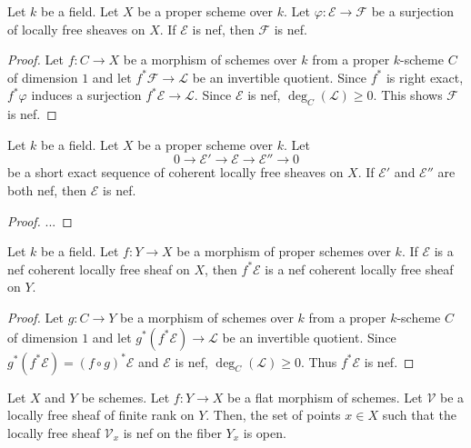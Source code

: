\begin{lemma}
\label{lemma-nef-bundle-quotient-nef}
Let $k$ be a field.
Let $X$ be a proper scheme over $k$.
Let $\varphi : \mathcal{E} \to \mathcal{F}$ be a surjection of locally free
sheaves on $X$.
If $\mathcal{E}$ is nef, then $\mathcal{F}$ is nef.
\end{lemma}

\begin{proof}
Let $f : C \to X$ be a morphism of schemes over $k$ from a proper $k$-scheme
$C$ of dimension $1$ and let $f^*\mathcal{F} \to \mathcal{L}$ be an invertible
quotient.
Since $f^*$ is right exact, $f^*\varphi$ induces a surjection
$f^*\mathcal{E} \to \mathcal{L}$.
Since $\mathcal{E}$ is nef, $\deg_C(\mathcal{L}) \geq 0$.
This shows $\mathcal{F}$ is nef.
\end{proof}

\begin{lemma}
\label{lemma-nef-bundle-extension-nef}
Let $k$ be a field.
Let $X$ be a proper scheme over $k$.
Let
$$
0 \to \mathcal{E}' \to \mathcal{E} \to \mathcal{E}'' \to 0
$$
be a short exact sequence of coherent locally free sheaves on $X$.
If $\mathcal{E}'$ and $\mathcal{E}''$ are both nef, then $\mathcal{E}$ is nef.
\end{lemma}

\begin{proof}
...
\end{proof}

\begin{lemma}
\label{lemma-nef-pullback-nef-vb}
Let $k$ be a field.
Let $f : Y \to X$ be a morphism of proper schemes over $k$.
If $\mathcal{E}$ is a nef coherent locally free sheaf on $X$, then
$f^*\mathcal{E}$ is a nef coherent locally free sheaf on $Y$.
\end{lemma}

\begin{proof}
Let $g : C \to Y$ be a morphism of schemes over $k$ from a proper $k$-scheme
$C$ of dimension $1$ and let $g^*(f^*\mathcal{E}) \to \mathcal{L}$ be an
invertible quotient.
Since $g^*(f^*\mathcal{E}) = (f \circ g)^*\mathcal{E}$ and $\mathcal{E}$ is
nef, $\deg_C(\mathcal{L}) \geq 0$.
Thus $f^*\mathcal{E}$ is nef.
\end{proof}

\begin{lemma}\label{semipos_locus_open}
Let $X$ and $Y$ be schemes.
Let $f:Y\to X$ be a flat morphism of schemes.
Let $\mathcal{V}$ be a locally free sheaf of finite rank on $Y$.
Then, the set of points $x\in X$ such that the locally free sheaf
$\mathcal{V}_x$ is nef on the fiber $Y_x$ is open.
\end{lemma}

